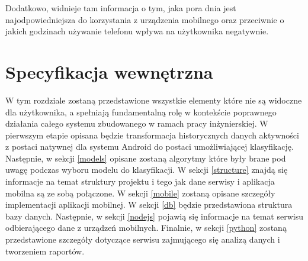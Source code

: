 \documentclass[a4paper,twoside,12pt]{book}
\begin{document}
Dodatkowo, widnieje tam informacja o tym, jaka pora dnia jest najodpowiedniejsza do korzystania z urządzenia mobilnego oraz przeciwnie o jakich godzinach używanie telefonu wpływa na użytkownika negatywnie. 



\chapter{Specyfikacja wewnętrzna}
\label{chap:wewn}
W tym rozdziale zostaną przedstawione wszystkie elementy które nie są widoczne dla użytkownika, a spełniają fundamentalną rolę w kontekście poprawnego działania całego systemu zbudowanego w ramach pracy inżynierskiej. W pierwszym etapie opisana będzie transformacja historycznych danych aktywności z postaci natywnej dla systemu Android do postaci umożliwiającej klasyfikację. Następnie, w sekcji \ref{models} opisane zostaną algorytmy które były brane pod uwagę podczas wyboru modelu do klasyfikacji. W sekcji \ref{structure} znajdą się informacje na temat struktury projektu i tego jak dane serwisy i aplikacja mobilna są ze sobą połączone. W sekcji \ref{mobile} zostaną opisane szczegóły implementacji aplikacji mobilnej. W sekcji \ref{db} będzie przedstawiona struktura bazy danych. Następnie, w sekcji \ref{nodejs} pojawią się informacje na temat serwisu odbierającego dane z urządzeń mobilnych. Finalnie, w sekcji \ref{python} zostaną przedstawione szczegóły dotyczące serwisu zajmującego się analizą danych i tworzeniem raportów.   
\end{document}
